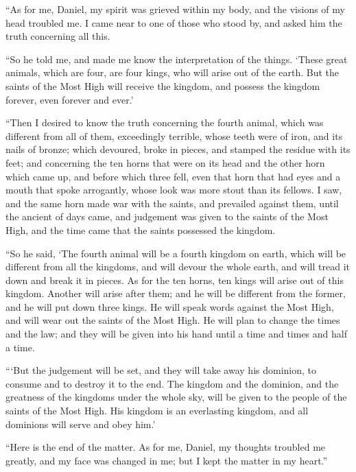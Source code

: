  ``As for me, Daniel, my spirit was grieved within my body,
and the visions of my head troubled me.  I came near to one
of those who stood by, and asked him the truth concerning all this.

``So he told me, and made me know the interpretation of the things.
 `These great animals, which are four, are four kings, who
will arise out of the earth.  But the saints of the Most
High will receive the kingdom, and possess the kingdom forever, even
forever and ever.'

 ``Then I desired to know the truth concerning the fourth
animal, which was different from all of them, exceedingly terrible,
whose teeth were of iron, and its nails of bronze; which devoured, broke
in pieces, and stamped the residue with its feet;  and
concerning the ten horns that were on its head and the other horn which
came up, and before which three fell, even that horn that had eyes and a
mouth that spoke arrogantly, whose look was more stout than its fellows.
 I saw, and the same horn made war with the saints, and
prevailed against them,  until the ancient of days came,
and judgement was given to the saints of the Most High, and the time
came that the saints possessed the kingdom.

 ``So he said, `The fourth animal will be a fourth kingdom
on earth, which will be different from all the kingdoms, and will devour
the whole earth, and will tread it down and break it in pieces.
 As for the ten horns, ten kings will arise out of this
kingdom. Another will arise after them; and he will be different from
the former, and he will put down three kings.  He will
speak words against the Most High, and will wear out the saints of the
Most High. He will plan to change the times and the law; and they will
be given into his hand until a time and times and half a time.

 ```But the judgement will be set, and they will take away
his dominion, to consume and to destroy it to the end.  The
kingdom and the dominion, and the greatness of the kingdoms under the
whole sky, will be given to the people of the saints of the Most High.
His kingdom is an everlasting kingdom, and all dominions will serve and
obey him.'

 ``Here is the end of the matter. As for me, Daniel, my
thoughts troubled me greatly, and my face was changed in me; but I kept
the matter in my heart.''

